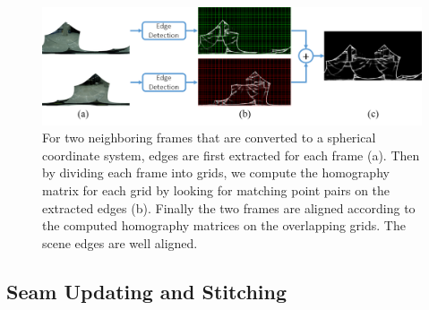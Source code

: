 \documentclass[conference]{IEEEtran}
\begin{document}
\begin{figure}[!htpb]
\centering
\includegraphics[scale=0.22]{picture41.png}
\caption{For two neighboring frames that are converted to a spherical coordinate system, edges are first extracted for each frame (a). Then by dividing each frame into grids,  we compute the homography matrix for each grid by looking for matching point pairs on the extracted edges (b).
Finally the two frames are aligned according to the computed homography matrices on the overlapping grids. The scene edges are well aligned.}
\label{fig:p8}
\end{figure}

\subsection{Seam Updating and Stitching}
\label{ssec:stitching}
\end{document}
